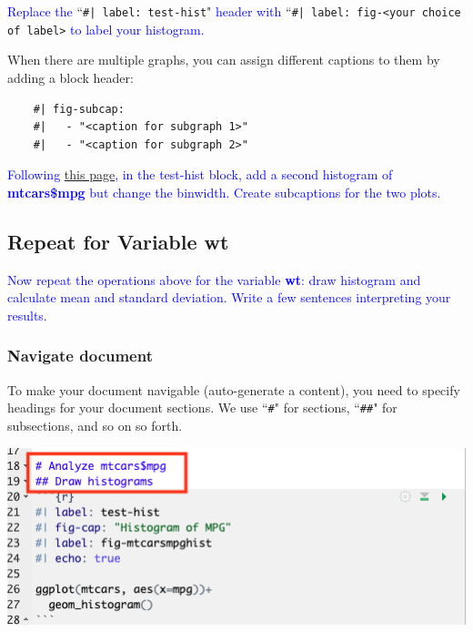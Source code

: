 \documentclass[12pt]{article}
\begin{document}
\textcolor{blue}{Replace the} ``\verb!#| label: test-hist!" \textcolor{blue}{header with} ``\verb!#| label: fig-<your choice of label>! \textcolor{blue}{to label your histogram.} 

When there are multiple graphs, you can assign different captions to them by adding a block header:
\begin{verbatim}
    #| fig-subcap: 
    #|   - "<caption for subgraph 1>"
    #|   - "<caption for subgraph 2>"
\end{verbatim}
\textcolor{blue}{Following \href{https://quarto.org/docs/authoring/figures.html\#subcaptions}{this page}, in the test-hist block, add a second histogram of \textbf{mtcars\$mpg} but change the binwidth. Create subcaptions for the two plots.}


\subsection{Repeat for Variable wt}
\textcolor{blue}{Now repeat the operations above for the variable \textbf{wt}: draw histogram and calculate mean and standard deviation. Write a few sentences interpreting your results.}

\subsubsection{Navigate document}
To make your document navigable (auto-generate a content), you need to specify headings for your document sections. We use ``\verb!#!" for sections, ``\verb!##!" for subsections, and so on so forth.
    \begin{center}
        \includegraphics[scale=.7]{headings.png}
    \end{center}
\end{document}
